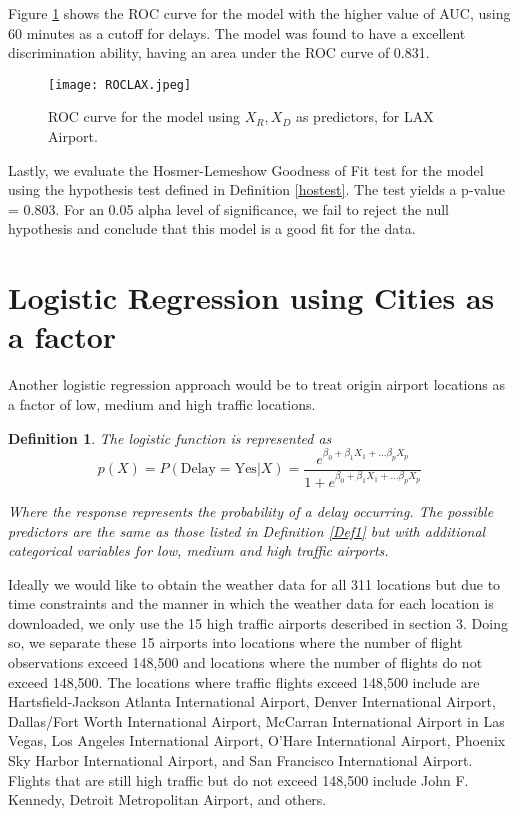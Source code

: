 \documentclass{asaproc}
\newtheorem{defn}{Definition}
\begin{document}
Figure \ref{fig:la3} shows the ROC curve for the model with the higher value of AUC, using 60 minutes as a cutoff for delays. The model was found to have a excellent discrimination ability, having an area under the ROC curve of 0.831.

\begin{figure}[h]
    \centering
    \texttt{[image: ROCLAX.jpeg]}
    \caption{ROC curve for the model using $X_R, X_D$ as predictors, for LAX Airport.}
    \label{fig:la3}
\end{figure}

Lastly, we evaluate the Hosmer-Lemeshow Goodness of Fit test \citep{hosmer1954applied} for the model using the hypothesis test defined in Definition \ref{hostest}. The test yields a p-value = 0.803. For an 0.05 alpha level of significance, we fail to reject the null hypothesis and conclude that this model is a good fit for the data.

\section{Logistic Regression using Cities as a factor}

Another logistic regression approach would be to treat origin airport locations as a factor of low, medium and high traffic locations.

\begin{defn}
The logistic function is represented as
$$p(X) = P(\text{Delay} = \text{Yes}|X) = \frac{e^{\beta_0 + \beta_1 X_1 +... \beta_p X_p}}{1 + e^{\beta_0 + \beta_1 X_1 +... \beta_p X_p}}$$

Where the response represents the probability of a delay occurring. The possible predictors are the same as those listed in Definition \ref{Def1} but with additional categorical variables for low, medium and high traffic airports.
\end{defn}

Ideally we would like to obtain the weather data for all 311 locations but due to time constraints and the manner in which the weather data for each location is downloaded, we only use the 15 high traffic airports described in section 3. Doing so, we separate these 15 airports into locations where the number of flight observations exceed 148,500 and locations where the number of flights do not exceed 148,500. The locations where traffic flights exceed 148,500 include are Hartsfield-Jackson Atlanta International Airport, Denver International Airport, Dallas/Fort Worth International Airport, McCarran International Airport in Las Vegas, Los Angeles International Airport, O'Hare International Airport, Phoenix Sky Harbor International Airport, and San Francisco International Airport. Flights that are still high traffic but do not exceed 148,500 include John F. Kennedy, Detroit Metropolitan Airport, and others.
\end{document}

